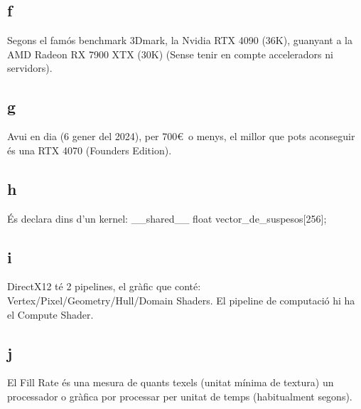 \documentclass[12pt]{article}
\begin{document}
\subsection{f}
Segons el famós benchmark 3Dmark, la Nvidia RTX 4090 (36K), guanyant a la AMD Radeon RX 7900 XTX (30K) (Sense tenir en compte acceleradors ni servidors).\cite{3dmark_benchmarks} \cite{pcworld_best_graphics_cards}

\subsection{g}
Avui en dia (6 gener del 2024), per 700\euro\ o menys, el millor que pots aconseguir és una RTX 4070 (Founders Edition).\cite{nvidia_rtx_4070} \cite{pcworld_best_graphics_cards}

\subsection{h}
És declara dins d'un kernel: \_\_shared\_\_ float vector\_de\_suspesos[256]; \cite{nvidia_cuda_c_guide}

\subsection{i}
DirectX12 té 2 pipelines, el gràfic que conté: Vertex/Pixel/Geometry/Hull/Domain Shaders. El pipeline de computació hi ha el Compute Shader.\cite{microsoft_directx12}

\subsection{j}
El Fill Rate és una mesura de quants texels (unitat mínima de textura) un processador o gràfica por processar per unitat de temps (habitualment segons).\cite{graphics_cards_slides}


\end{document}
